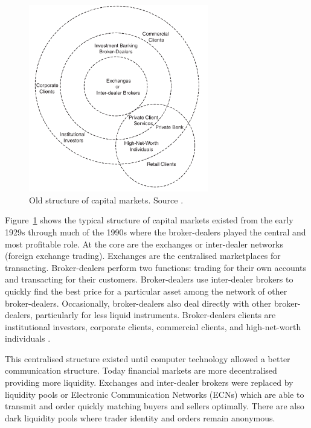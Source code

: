 \begin{figure}[!h]
  \centering
  \includegraphics[width=0.7\textwidth]{img/capitalmarkets}
  \caption[Old structure of capital markets]{Old structure of capital markets.
  Source \cite{aldridge2009}.}
  \label{fig:capitalmarket}
\end{figure}
Figure~\ref{fig:capitalmarket} shows the typical structure of capital markets
existed from the early 1929s through much of the 1990s where the broker-dealers
played the central and most profitable role.  At the core are the exchanges or
inter-dealer networks (foreign exchange trading). Exchanges are the centralised
marketplaces for transacting.  Broker-dealers perform two functions: trading for
their own accounts and transacting for their customers. Broker-dealers use
inter-dealer brokers to quickly find the best price for a particular asset among
the network of other broker-dealers. Occasionally, broker-dealers also deal
directly with other broker-dealers, particularly for less liquid instruments.
Broker-dealers clients are institutional investors, corporate clients,
commercial clients, and high-net-worth individuals \cite{aldridge2009}.

This centralised structure existed until computer technology allowed a better
communication structure. Today financial markets are more decentralised
providing more liquidity. Exchanges and inter-dealer brokers were replaced by
liquidity pools or Electronic Communication Networks (ECNs) which are able to
transmit and order quickly matching buyers and sellers optimally. There are also
dark liquidity pools where trader identity and orders remain anonymous.

